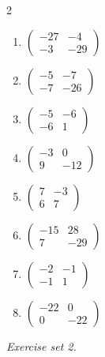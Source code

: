 \begin{multicols}{2}
\begin{enumerate}[label=\arabic*., leftmargin=*, itemsep=1pt]
\item $\left(\begin{smallmatrix}-27 & -4\\ -3 & -29\end{smallmatrix}\right)$
\item $\left(\begin{smallmatrix}-5 & -7\\ -7 & -26\end{smallmatrix}\right)$
\item $\left(\begin{smallmatrix}-5 & -6\\ -6 & 1\end{smallmatrix}\right)$
\item $\left(\begin{smallmatrix}-3 & 0\\ 9 & -12\end{smallmatrix}\right)$
\item $\left(\begin{smallmatrix}7 & -3\\ 6 & 7\end{smallmatrix}\right)$
\item $\left(\begin{smallmatrix}-15 & 28\\ 7 & -29\end{smallmatrix}\right)$
\item $\left(\begin{smallmatrix}-2 & -1\\ -1 & 1\end{smallmatrix}\right)$
\item $\left(\begin{smallmatrix}-22 & 0\\ 0 & -22\end{smallmatrix}\right)$
\end{enumerate}
\end{multicols}
\par\noindent\emph{Exercise set 2.}\nopagebreak
